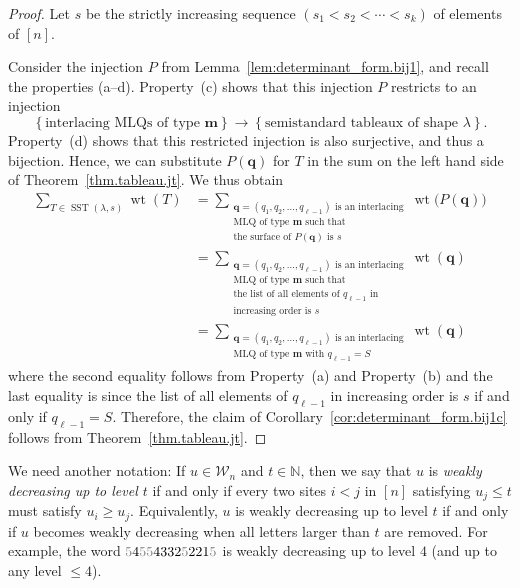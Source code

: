 \documentclass[reqno]{amsart}
\newcommand{\0}{\phantom{c}}
\DeclareMathOperator{\wt}{wt} %
\DeclareMathOperator{\SST}{SST} %
\newcommand{\mm}{\mathbf{m}}
\newcommand{\qq}{\mathbf{q}}
\newcommand{\mcW}{\mathcal{W}}
\newcommand{\NN}{\mathbb{N}}
\let\sumnonlimits\sum
\renewcommand{\sum}{\sumnonlimits\limits}
\newcommand{\set}[1]{\left\{ #1 \right\}}
\newcommand{\tup}[1]{\left( #1 \right)}
\newcommand{\ive}[1]{\left[ #1 \right]}
\newcommand{\defn}[1]{{\color{darkred}\emph{#1}}} %
\theoremstyle{plain}
\theoremstyle{definition}
\numberwithin{equation}{section}
\begin{document}
\begin{proof}
Let $s$ be the strictly increasing sequence $\tup{s_1 < s_2 < \cdots < s_k}$ of elements of $\ive{n}$.

Consider the injection $P$ from Lemma~\ref{lem:determinant_form.bij1}, and recall the properties (a--d).
Property~(c) shows that this injection $P$ restricts to an injection
\[
\set{\text{interlacing MLQs of type } \mm}  \to \set{  \text{semistandard tableaux of shape } \lambda}.
\]
Property~(d) shows that this restricted injection is also surjective, and thus a bijection.
Hence, we can substitute $P(\qq)$ for $T$ in the sum on the left hand side of Theorem~\ref{thm.tableau.jt}.
We thus obtain
\begin{align*}
\sum_{T \in \SST(\lambda, s)} \wt(T)
  & = \sum_{\substack{\qq=\tup{q_1, q_2, \dotsc, q_{\ell-1}} \text{ is an interlacing}\\\text{MLQ of type } \mm \text{ such that} \\\text{the surface of }P(\qq) \text{ is } s}} \wt\bigl(  P(\qq) \bigr) \\
&  = \sum_{\substack{\qq= \tup{q_1, q_2, \dotsc,q_{\ell-1}} \text{ is an interlacing}\\\text{MLQ of type } \mm \text{ such that}\\\text{the list of all elements of } q_{\ell-1} \text{ in} \\\text{increasing order is } s}} \wt(\qq) \\
&  = \sum_{\substack{\qq = \tup{q_1,q_2,\dotsc,q_{\ell-1}} \text{ is an interlacing}\\\text{MLQ of type } \mm \text{ with } q_{\ell-1} = S}} \wt(\qq)
\end{align*}
where the second equality follows from Property~(a) and Property~(b) and the last equality is since the list of all elements of $q_{\ell-1}$ in increasing order is $s$ if and only if $q_{\ell-1}=S$.
Therefore, the claim of Corollary~\ref{cor:determinant_form.bij1c} follows from Theorem~\ref{thm.tableau.jt}.
\end{proof}

We need another notation:
If $u \in \mcW_n$ and $t \in \NN$, then we say that $u$ is \defn{weakly decreasing up to level $t$} if and only if every two sites $i < j$ in $\ive{n}$ satisfying $u_j \leq t$ must satisfy $u_i \geq u_j$.
Equivalently, $u$ is weakly decreasing up to level $t$ if and only if $u$ becomes weakly decreasing when all letters larger than $t$ are removed.
For example, the word ${\color{gray}5}4{\color{gray}55}4332{\color{gray}5}221{\color{gray}5}$ is weakly decreasing up to level $4$ (and up to any level $\leq4$).
\end{document}
